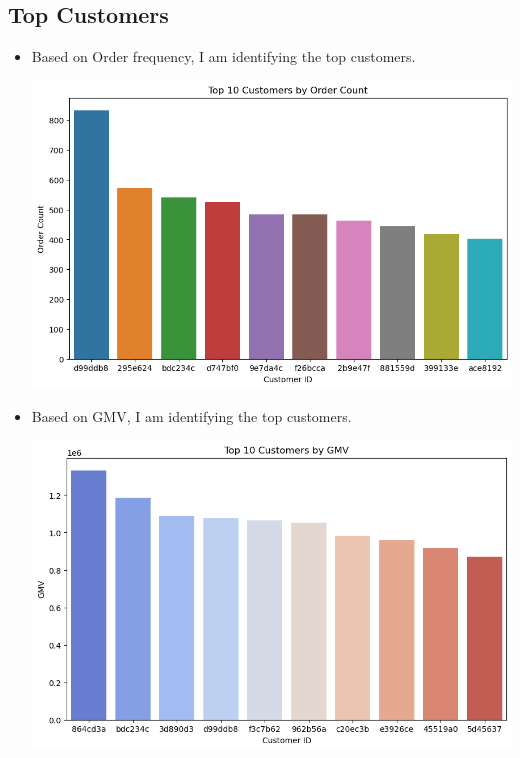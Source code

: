 \documentclass{article}
\begin{document}
    \subsection{Top Customers}
    \begin{itemize}
        \item Based on Order frequency, I am identifying the top customers.{
            \begin{center}
                \includegraphics[width=1\columnwidth]{images/customer_purchase_frequency.png}
            \end{center}
        }
        
        
        \item Based on GMV, I am identifying the top customers.{
            \begin{center}
                \includegraphics[width=1\columnwidth]{images/top_customers_by_gm.png}
            \end{center}
        }
    \end{itemize}
    
\end{document}
